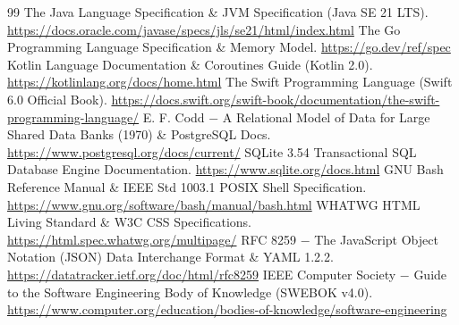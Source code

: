 \documentclass{book}
\begin{document}
\begin{thebibliography}{99}
 The Java Language Specification \& JVM Specification (Java SE 21 LTS). \url{https://docs.oracle.com/javase/specs/jls/se21/html/index.html}
 The Go Programming Language Specification \& Memory Model. \url{https://go.dev/ref/spec}
 Kotlin Language Documentation \& Coroutines Guide (Kotlin 2.0). \url{https://kotlinlang.org/docs/home.html}
 The Swift Programming Language (Swift 6.0 Official Book). \url{https://docs.swift.org/swift-book/documentation/the-swift-programming-language/}
 E. F. Codd \(-\) A Relational Model of Data for Large Shared Data Banks (1970) \& PostgreSQL Docs. \url{https://www.postgresql.org/docs/current/}
 SQLite 3.54 Transactional SQL Database Engine Documentation. \url{https://www.sqlite.org/docs.html}
 GNU Bash Reference Manual \& IEEE Std 1003.1 POSIX Shell Specification. \url{https://www.gnu.org/software/bash/manual/bash.html}
 WHATWG HTML Living Standard \& W3C CSS Specifications. \url{https://html.spec.whatwg.org/multipage/}
 RFC 8259 \(-\) The JavaScript Object Notation (JSON) Data Interchange Format \& YAML 1.2.2. \url{https://datatracker.ietf.org/doc/html/rfc8259}
 IEEE Computer Society \(-\) Guide to the Software Engineering Body of Knowledge (SWEBOK v4.0). \url{https://www.computer.org/education/bodies-of-knowledge/software-engineering}
\end{thebibliography}
\end{document}
